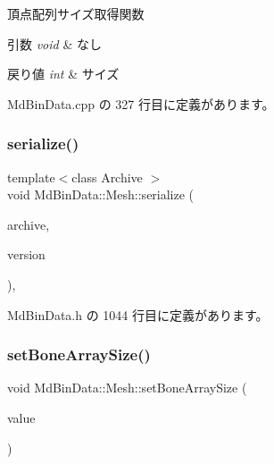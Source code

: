 頂点配列サイズ取得関数 


\begin{DoxyParams}{引数}
{\em void} & なし \\
\hline
\end{DoxyParams}

\begin{DoxyRetVals}{戻り値}
{\em int} & サイズ \\
\hline
\end{DoxyRetVals}


 Md\+Bin\+Data.\+cpp の 327 行目に定義があります。

\mbox{\label{class_md_bin_data_1_1_mesh_ae3ea8741ba987736f141d4b20470293d}} 
\subsubsection{\texorpdfstring{serialize()}{serialize()}}
{\footnotesize\ttfamily template$<$class Archive $>$ \\
void Md\+Bin\+Data\+::\+Mesh\+::serialize (\begin{DoxyParamCaption}\item[{Archive \&}]{archive,  }\item[{const unsigned}]{version }\end{DoxyParamCaption})\hspace{0.3cm}{\ttfamily [inline]}, {\ttfamily [private]}}



 Md\+Bin\+Data.\+h の 1044 行目に定義があります。

\mbox{\label{class_md_bin_data_1_1_mesh_a8b8125b4e6e716421edbe6e712b5615a}} 
\subsubsection{\texorpdfstring{set\+Bone\+Array\+Size()}{setBoneArraySize()}}
{\footnotesize\ttfamily void Md\+Bin\+Data\+::\+Mesh\+::set\+Bone\+Array\+Size (\begin{DoxyParamCaption}\item[{int}]{value }\end{DoxyParamCaption})}



